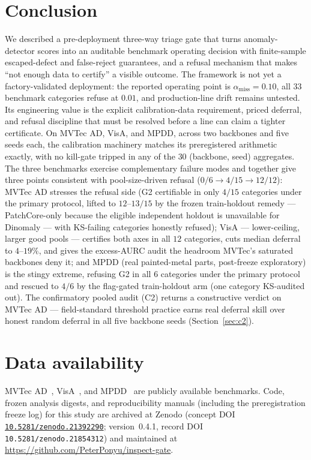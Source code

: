 \documentclass[preprint,11pt]{elsarticle}
\begin{document}
\section{Conclusion}
\label{sec:conclusion}

We described a pre-deployment three-way triage gate that turns anomaly-detector scores into an
auditable benchmark operating decision with finite-sample escaped-defect and false-reject guarantees, and a
refusal mechanism that makes ``not enough data to certify'' a visible outcome. The framework is not yet a
factory-validated deployment: the reported operating point is $\alpha_{\text{miss}}=0.10$, all $33$
benchmark categories refuse at $0.01$, and production-line drift remains untested. Its engineering value is
the explicit calibration-data requirement, priced deferral, and refusal discipline that must be resolved
before a line can claim a tighter certificate. On MVTec AD,
VisA, and MPDD, across two backbones and five seeds each, the calibration machinery matches its
preregistered arithmetic exactly, with no kill-gate tripped in any of the $30$ (backbone, seed)
aggregates. The three benchmarks exercise complementary failure modes and together give three
points consistent with pool-size-driven refusal ($0/6 \to 4/15 \to 12/12$): MVTec AD
stresses the refusal side (G2 certifiable in only $4/15$ categories under the primary protocol,
lifted to $12$--$13/15$ by the frozen train-holdout remedy --- PatchCore-only because the
eligible independent holdout is unavailable for Dinomaly --- with KS-failing categories honestly refused);
VisA --- lower-ceiling, larger good pools --- certifies both axes in all $12$ categories,
cuts median deferral to $4$--$19\%$, and gives the excess-AURC audit the headroom MVTec's
saturated backbones deny it; and MPDD (real painted-metal parts, post-freeze exploratory) is the
stingy extreme, refusing G2 in all $6$ categories under the primary protocol and rescued to $4/6$
by the flag-gated train-holdout arm (one category KS-audited out). The confirmatory pooled audit
(C2) returns a constructive verdict on
MVTec AD --- field-standard threshold practice earns real deferral skill over honest random deferral
in all five backbone seeds (Section~\ref{sec:c2}).

\section*{Data availability}
MVTec AD~\citep{bergmann2019mvtec}, VisA~\citep{zou2022spot}, and
MPDD~\citep{jezek2021mpdd} are publicly available benchmarks. Code, frozen analysis digests, and
reproducibility manuals (including the preregistration freeze log) for this study are archived at
Zenodo (concept DOI
\href{https://doi.org/10.5281/zenodo.21392290}{\texttt{10.5281/zenodo.21392290}};
version~0.4.1, record DOI \texttt{10.5281/zenodo.21854312}) and maintained at
\url{https://github.com/PeterPonyu/inspect-gate}.
\end{document}
